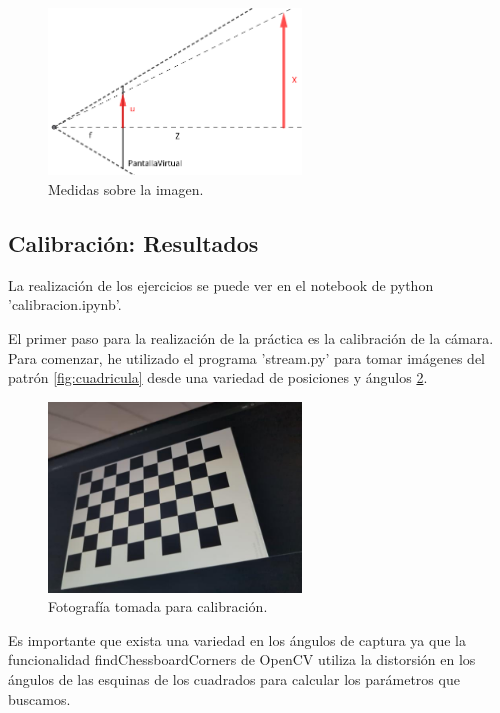 \documentclass[12pt]{article}
\begin{document}
\begin{figure}[H]
    \centering
    \includegraphics[width=0.6\textwidth]{images_calibracion/Tales.png}  %
    \caption{Medidas sobre la imagen.}
    \label{fig:Tales}
\end{figure}

\subsection{Calibración: Resultados}

La realización de los ejercicios se puede ver en el notebook de python 'calibracion.ipynb'. 

El primer paso para la realización de la práctica es la calibración de la cámara. 
Para comenzar, he utilizado el programa 'stream.py' para tomar imágenes del patrón \ref{fig:cuadricula} desde una variedad de posiciones y ángulos \ref{fig:calibracion}. 
\begin{figure}[H]
    \centering
    \includegraphics[width=0.6\textwidth]{images_calibracion/Calibracion.png}  %
    \caption{Fotografía tomada para calibración.}
    \label{fig:calibracion}
\end{figure}
Es importante que exista una variedad en los ángulos de captura ya que la funcionalidad findChessboardCorners de OpenCV utiliza la distorsión en los ángulos de las esquinas de los cuadrados para calcular los parámetros que buscamos.
\end{document}
